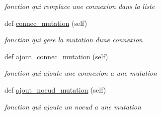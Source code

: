 \begin{DoxyCompactItemize}
\begin{DoxyCompactList}\small\item\em fonction qui remplace une connexion dans la liste \end{DoxyCompactList}\item 
def \hyperlink{classsrc_1_1_i_a_1_1genome_1_1_genome_a2b233eb27662060165e583fb4e54f0d0}{connec\+\_\+mutation} (self)
\begin{DoxyCompactList}\small\item\em fonction qui gere la mutation d\textquotesingle{}une connexion \end{DoxyCompactList}\item 
def \hyperlink{classsrc_1_1_i_a_1_1genome_1_1_genome_a6f7059702835cf2c68493e9b55216c74}{ajout\+\_\+connec\+\_\+mutation} (self)
\begin{DoxyCompactList}\small\item\em fonction qui ajoute une connexion a une mutation \end{DoxyCompactList}\item 
def \hyperlink{classsrc_1_1_i_a_1_1genome_1_1_genome_a48edc3632415eccdb7116dec4d9ba8c0}{ajout\+\_\+noeud\+\_\+mutation} (self)
\begin{DoxyCompactList}\small\item\em fonction qui ajoute un noeud a une mutation \end{DoxyCompactList}\end{DoxyCompactItemize}
